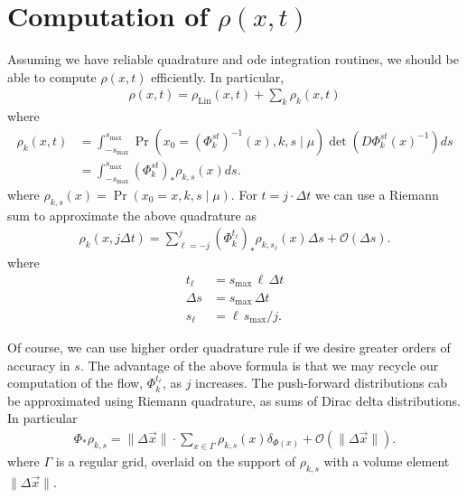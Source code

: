 \documentclass[12pt]{amsart}
\DeclareMathOperator{\Lin}{Lin}
\begin{document}
\section{Computation of $\rho(x,t)$}
Assuming we have reliable quadrature and ode integration routines, we should be able to compute $\rho(x,t)$ efficiently.
In particular,
\begin{align*}
	\rho(x,t) = \rho_{\Lin}(x,t) +  \sum_{k} \rho_k(x,t)
\end{align*}
where
\begin{align*}
	\rho_k(x,t) &= \int_{-s_{\max}}^{s_{\max}} \Pr( x_0 = (\Phi_k^{st})^{-1}(x) , k , s \mid \mu ) \det( D\Phi_k^{st}(x)^{-1} ) ds \\
		&= \int_{-s_{\max}}^{ s_{\max}} (\Phi_{k}^{st})_* \rho_{k,s}(x) ds.
\end{align*}
where $\rho_{k,s}(x) =  \Pr( x_0 =x , k , s \mid \mu )$.
For $t = j \cdot \Delta t$ we can use a Riemann sum to approximate the above quadrature as
\begin{align*}
	\rho_k(x, j \Delta t) = \sum_{\ell = -j}^{j} (\Phi_{k}^{ t_\ell } )_* \rho_{k,s_\ell}(x) \Delta s + \mathcal{O}( \Delta s ).
\end{align*}
where
\begin{align*}
	t_\ell &= s_{\max}\, \ell \, \Delta t \\
	\Delta s &= s_{\max} \, \Delta t \\
	s_\ell &= \ell \, s_{\max} / j.
\end{align*}

Of course, we can use higher order quadrature rule if we desire greater orders of accuracy in $s$.
The advantage of the above formula is that we may recycle our computation of the flow, $\Phi_k^{t_\ell}$, as $j$ increases.
The push-forward distributions cab be approximated using Riemann quadrature, as sums of Dirac delta distributions.
In particular
\begin{align*}
	\Phi_* \rho_{k,s} = \| \Delta \vec{x} \| \cdot \sum_{x \in \Gamma} \rho_{k,s}( x ) \delta_{ \Phi(x) } + \mathcal{O}( \| \Delta \vec{x} \| ).
\end{align*}
where $\Gamma$ is a regular grid, overlaid on the support of $\rho_{k,s}$ with a volume element $\| \Delta \vec{x} \|$.
\end{document}
